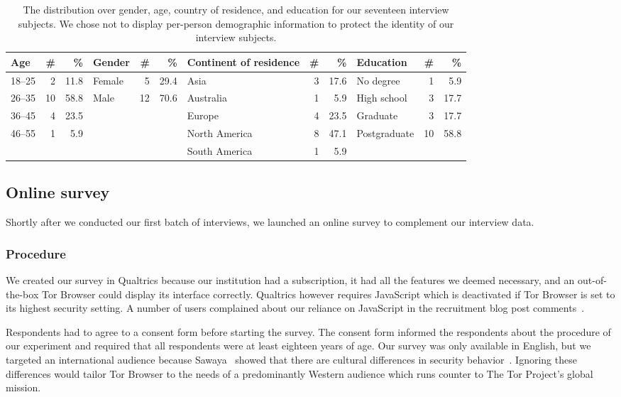 \begin{table*}[ht]
	\centering
	\caption{The distribution over gender, age, country of residence, and
	education for our seventeen interview subjects.  We chose not to display
	per-person demographic information to protect the identity of our interview
	subjects.}
	\label{tab:interviewees}
	\begin{tabular}{l r r | l r r | l r r | l r r}
	\toprule
	Age & \# & \% &
	Gender & \# & \% &
	Continent of residence & \# & \% &
	Education & \# & \% \\
	\midrule
	18--25 & 2  & 11.8 & Female & 5  & 29.4 & Asia          & 3 & 17.6 & No degree    & 1  & 5.9 \\
	26--35 & 10 & 58.8 & Male   & 12 & 70.6 & Australia     & 1 &  5.9 & High school  & 3  & 17.7 \\
	36--45 & 4  & 23.5 &        &    &      & Europe        & 4 & 23.5 & Graduate     & 3  & 17.7 \\
	46--55 & 1  & 5.9  &        &    &      & North America & 8 & 47.1 & Postgraduate & 10 & 58.8 \\
	       &    &      &        &    &      & South America & 1 &  5.9 & & & \\
	\bottomrule
	\end{tabular}
\end{table*}

\subsection{Online survey}
\label{sec:online-survey}

Shortly after we conducted our first batch of interviews, we launched an online
survey to complement our interview data.

\subsubsection{Procedure}

We created our survey in Qualtrics because our institution had a subscription,
it had all the features we deemed necessary, and an out-of-the-box Tor Browser
could display its interface correctly.  Qualtrics however requires JavaScript
which is deactivated if Tor Browser is set to its highest security setting.  A
number of users complained about our reliance on JavaScript in the recruitment
blog post comments~\cite{Winter2017a}.

Respondents had to agree to a consent form before starting the survey. The
consent form informed the respondents about the procedure of our experiment and
required that all respondents were at least eighteen years of age.  Our survey
was only available in English, but we targeted an international audience because
Sawaya \ea\ showed that there are cultural differences in security
behavior~\cite{Sawaya2017a}.  Ignoring these differences would tailor Tor
Browser to the needs of a predominantly Western audience which runs counter to
The Tor Project's global mission.

